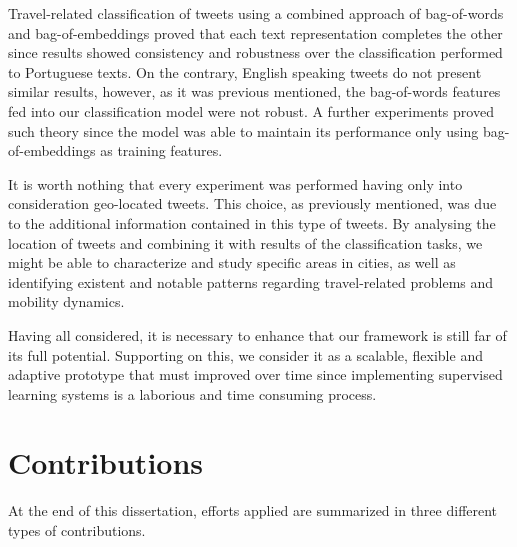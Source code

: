 Travel-related classification of tweets using a combined approach of bag-of-words and bag-of-embeddings proved that each text representation completes the other since results showed consistency and robustness over the classification performed to Portuguese texts. On the contrary, English speaking tweets do not present similar results, however, as it was previous mentioned, the bag-of-words features fed into our classification model were not robust. A further experiments proved such theory since the model was able to maintain its performance only using bag-of-embeddings as training features.

It is worth nothing that every experiment was performed having only into consideration geo-located tweets. This choice, as previously mentioned, was due to the additional information contained in this type of tweets. By analysing the location of tweets and combining it with results of the classification tasks, we might be able to characterize and study specific areas in cities, as well as identifying existent and notable patterns regarding travel-related problems and mobility dynamics.

Having all considered, it is necessary to enhance that our framework is still far of its full potential. Supporting on this, we consider it as a scalable, flexible and adaptive prototype that must improved over time since implementing supervised learning systems is a laborious and time consuming process.


\section{Contributions}

At the end of this dissertation, efforts applied are summarized in three different types of contributions.

